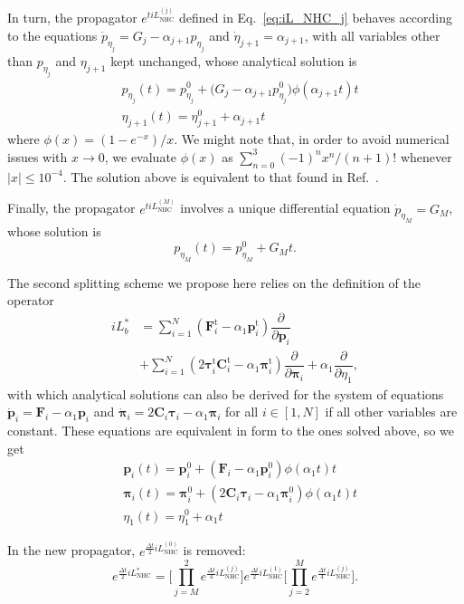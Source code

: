 \documentclass[aip,jcp,reprint,amsmath,amssymb]{revtex4-1}
\newcommand{\mt}[1]{\boldsymbol{\mathbf{#1}}}           %
\newcommand{\vt}[1]{\boldsymbol{\mathbf{#1}}}           %
\newcommand{\tr}[1]{#1^\text{t}}                        %
\newcommand{\diff}[2]{\dfrac{\partial #1}{\partial #2}} %
\begin{document}
In turn, the propagator $e^{t i\!L_\text{NHC}^{(j)}}$ defined in Eq.~\eqref{eq:iL_NHC_j} behaves according to the equations $\dot{p}_{\eta_j} = G_j - \alpha_{j+1} p_{\eta_j}$ and $\dot{\eta}_{j+1} = \alpha_{j+1}$, with all variables other than $p_{\eta_j}$ and $\eta_{j+1}$ kept unchanged, whose analytical solution is
\begin{align*}
&p_{\eta_j}(t) = p_{\eta_j}^0 + \Big( G_j - \alpha_{j+1} p_{\eta_j}^0 \Big) \phi\left(\alpha_{j+1} t\right) t \\
&\eta_{j+1}(t) = \eta_{j+1}^0 + \alpha_{j+1} t
\end{align*}
where $\phi(x) = (1-e^{-x})/x$. We might note that, in order to avoid numerical issues with $x \rightarrow 0$, we evaluate $\phi(x)$ as $\sum_{n=0}^3 {(-1)^n x^n}/{(n+1)!}$ whenever $|x| \leq 10^{-4}$. The solution above is equivalent to that found in Ref.~.

Finally, the propagator $e^{t i\!L_\text{NHC}^{(M)}}$ involves a unique differential equation $\dot{p}_{\eta_M} = G_M$, whose solution is
\[
p_{\eta_M}(t) = p_{\eta_M}^0 + G_M t.
\]

The second splitting scheme we propose here relies on the definition of the operator
\begin{align*}
i\!L_b^\ast &= \sum_{i=1}^N \left( \tr{\vt F}_i - \alpha_1 \tr{\vt p}_i \right) \diff{}{\vt p_i} \\
&+ \sum_{i=1}^N \left(2 \tr{\vt \tau}_i \tr{\mt C}_i - \alpha_1 \tr{\vt \pi}_i \right) \diff{}{\vt \pi_i} + \alpha_1 \diff{}{\eta_1},
\end{align*}
with which analytical solutions can also be derived for the system of equations $\dot{\vt p}_i = {\vt F}_i - \alpha_1 \vt p_i$ and $\dot{\vt \pi}_i = 2 \mt C_i \vt \tau_i - \alpha_1 \vt \pi_i$ for all $i \in [1,N]$ if all other variables are constant. These equations are equivalent in form to the ones solved above, so we get
\begin{align*}
&{\vt p}_i(t) = {\vt p}_i^0 + \left({\vt F}_i - \alpha_1 {\vt p}_i^0 \right) \phi\left(\alpha_1 t \right) t \\
&{\vt \pi}_i(t) = {\vt \pi}_i^0 + \left(2 {\mt C}_i{\vt \tau}_i - \alpha_1 {\vt \pi}_i^0 \right) \phi\left(\alpha_1 t \right) t \\
&\eta_1(t) = \eta_1^0 + \alpha_1 t
\end{align*}

In the new propagator, $e^{\frac{\Delta t}{2} i\!L_\text{NHC}^{(0)} }$ is removed:
\[
e^{\frac{\Delta t}{2} i\!L_\text{NHC}^\ast} = \Bigg[ \prod_{j=M}^2 e^{\frac{\Delta t}{4} i\!L_\text{NHC}^{(j)} } \Bigg] e^{\frac{\Delta t}{2} i\!L_\text{NHC}^{(1)} } \Bigg[ \prod_{j=2}^M e^{\frac{\Delta t}{4} i\!L_\text{NHC}^{(j)} } \Bigg].
\]
\end{document}
